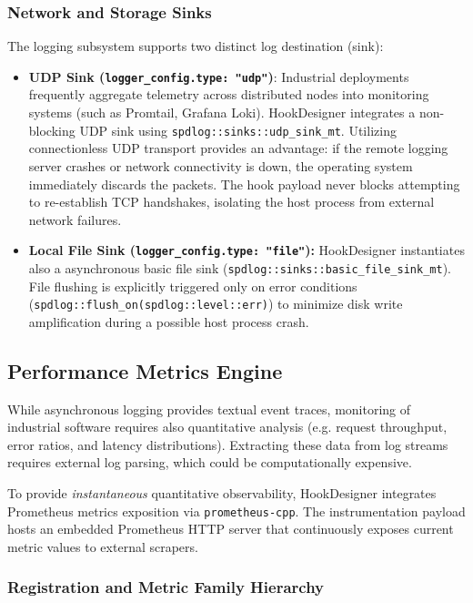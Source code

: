 \subsubsection{Network and Storage Sinks}

The logging subsystem supports two distinct log destination (sink):
\begin{itemize}
	\item \textbf{UDP Sink (\texttt{logger\_config.type: "udp"})}:
	Industrial deployments frequently aggregate telemetry across distributed nodes into monitoring systems (such as Promtail, Grafana Loki).
	HookDesigner integrates a non-blocking UDP sink using \texttt{spdlog::}\allowbreak\texttt{sinks::}\allowbreak\texttt{udp\_sink\_mt}.
	Utilizing connectionless \ac{UDP} transport provides an advantage: if the remote logging server crashes or network connectivity is down, the operating system immediately discards the packets.
	The hook payload never blocks attempting to re-establish TCP handshakes, isolating the host process from external network failures.

	\item \textbf{Local File Sink (\texttt{logger\_config.type: "file"}):}
	HookDesigner instantiates also a asynchronous basic file sink (\texttt{spdlog::sinks::basic\_file\_sink\_mt}).
	File flushing is explicitly triggered only on error conditions (\texttt{spdlog::flush\_on(spdlog::level::err)}) to minimize disk write amplification during a possible host process crash.
\end{itemize}

\subsection{Performance Metrics Engine}
\label{subsec:prometheus}

While asynchronous logging provides textual event traces, monitoring of industrial software requires also quantitative analysis (e.g. request throughput, error ratios, and latency distributions).
Extracting these data from log streams requires external log parsing, which could be computationally expensive.

To provide \emph{instantaneous} quantitative observability, HookDesigner integrates Prometheus metrics exposition via \texttt{prometheus-cpp}.
The instrumentation payload hosts an embedded Prometheus HTTP server that continuously exposes current metric values to external scrapers.

\subsubsection{Registration and Metric Family Hierarchy}

